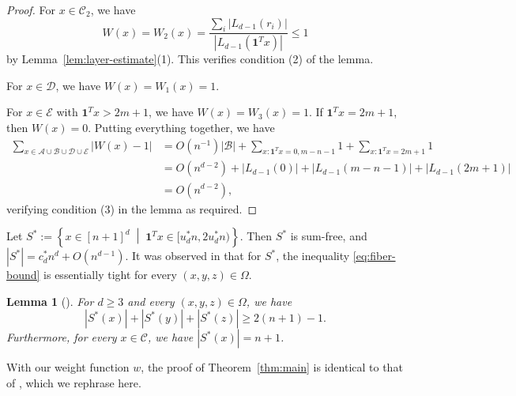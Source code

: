 \documentclass{article}
\newcommand{\setcond}[2]{\left\{ #1 \;\middle\vert\; #2 \right\}}
\newcommand{\cA}{\mathcal{A}}
\newcommand{\cB}{\mathcal{B}}
\newcommand{\cC}{\mathcal{C}}
\newcommand{\cD}{\mathcal{D}}
\newcommand{\cE}{\mathcal{E}}
\newcommand{\ones}{\mathbf{1}}
\newtheorem{lem}[thm]{Lemma}
\theoremstyle{definition}
\begin{document}
\begin{proof}
    For $x\in \cC_2$, we have 
    \[W(x) = W_2(x) = \frac{\sum_i |L_{d-1}(r_i)|}{|L_{d-1}(\ones^T x)|}\leq 1\]
    by Lemma~\ref{lem:layer-estimate}(1). This verifies condition (2) of the lemma.

    For $x\in \cD$, we have $W(x) = W_1(x)=1$. 
    
    For $x\in \cE$ with $\ones^T x > 2m+1$, we have $W(x) = W_3(x) = 1$. If $\ones^T x = 2m+1$, then $W(x)=0$. Putting everything together, we have
    \begin{align*}
        \sum_{x\in \cA\cup \cB\cup \cD\cup \cE} |W(x)-1| & = O(n^{-1})|\cB| + \sum_{x:\ones^T x=0,m-n-1}1 + \sum_{x:\ones^T x=2m+1}1\\
        & = O(n^{d-2}) + |L_{d-1}(0)| + |L_{d-1}(m-n-1)| + |L_{d-1}(2m+1)|\\
        &= O(n^{d-2}),
    \end{align*}
    verifying condition (3) in the lemma as required.
\end{proof}

Let $S^* := \setcond{x\in [n+1]^d}{\ones^T x \in [u_d^* n, 2u_d^* n)}$. Then $S^*$ is sum-free, and $|S^*|=c_d^* n^d + O(n^{d-1})$. It was observed in \cite{LS23} that for $S^*$, the inequality \eqref{eq:fiber-bound} is essentially tight for every $(x,y,z)\in \Omega$. 
\begin{lem}[{\cite[Lemma~2.4]{LS23}}] \label{lem:fiber-tight}
    For $d\geq 3$ and every $(x,y,z)\in \Omega$, we have 
    \[|S^*(x)|+|S^*(y)|+|S^*(z)| \geq 2(n+1)-1.\]
    Furthermore, for every $x\in \cC$, we have $|S^*(x)|=n+1$.
\end{lem}

With our weight function $w$, the proof of Theorem~\ref{thm:main} is identical to that of \cite{LS23}, which we rephrase here.
\end{document}
